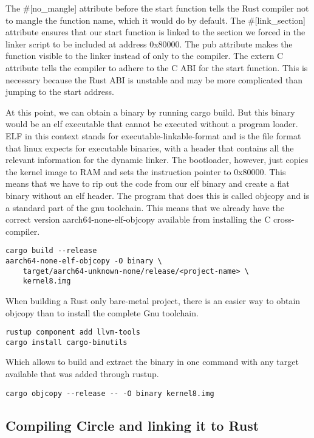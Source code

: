 The \#[no\_mangle] attribute before the start function tells the Rust compiler not to mangle the function name, which it would do by default.
The \#[link\_section] attribute ensures that our start function is linked to the section we forced in the linker script to be included at address 0x80000.
The pub attribute makes the function visible to the linker instead of only to the compiler.
The extern C attribute tells the compiler to adhere to the C ABI for the start function.
This is necessary because the Rust ABI is unstable and may be more complicated than jumping to the start address.

At this point, we can obtain a binary by running cargo build.
But this binary would be an elf executable that cannot be executed without a program loader.
ELF in this context stands for executable-linkable-format and is the file format that linux expects for executable binaries,
with a header that contains all the relevant information for the dynamic linker.
The bootloader, however, just copies the kernel image to RAM and sets the instruction pointer to 0x80000.
This means that we have to rip out the code from our elf binary and create a flat binary without an elf header.
The program that does this is called objcopy and is a standard part of the gnu toolchain.
This means that we already have the correct version aarch64-none-elf-objcopy available from installing the C cross-compiler.

\begin{verbatim}
cargo build --release
aarch64-none-elf-objcopy -O binary \
    target/aarch64-unknown-none/release/<project-name> \
    kernel8.img
\end{verbatim}

When building a Rust only bare-metal project, there is an easier way to obtain objcopy than to install the complete Gnu toolchain.
\begin{verbatim}
rustup component add llvm-tools
cargo install cargo-binutils
\end{verbatim}
Which allows to build and extract the binary in one command with any target available that was added through rustup.
\begin{verbatim}
cargo objcopy --release -- -O binary kernel8.img
\end{verbatim}

\subsection{Compiling Circle and linking it to Rust}
\label{sec:concept_and_implementation:bare-metal:ffi}

